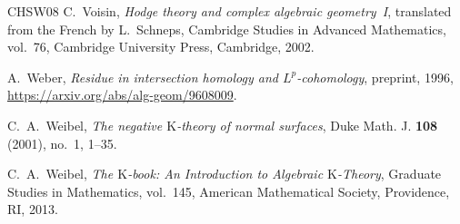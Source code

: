 \documentclass{amsart}
\theoremstyle{plain}
\theoremstyle{definition}
\newcommand{\K}{\mathrm{K}}
\begin{document}
\begin{thebibliography}{CHSW08}
C.~Voisin, \emph{Hodge theory and complex algebraic geometry~I}, translated from the French by L.~Schneps, Cambridge Studies in Advanced Mathematics, vol.~76, Cambridge University Press, Cambridge, 2002.

A.~Weber,
\emph{Residue in intersection homology and $L^p$-cohomology}, preprint, 1996,
\url{https://arxiv.org/abs/alg-geom/9608009}.

C.~A.~Weibel,
\emph{The negative $\K$-theory of normal surfaces}, Duke Math. J. \textbf{108} (2001), no.~1, 1--35.

C.~A.~Weibel,
\emph{The $\K$-book: An Introduction to Algebraic $\K$-Theory}, Graduate Studies in Mathematics, vol.~145, American Mathematical Society, Providence, RI, 2013.


\end{thebibliography}
\end{document}
